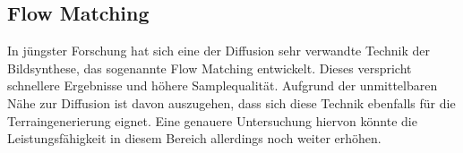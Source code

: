 \subsection{Flow Matching}

In jüngster Forschung hat sich eine der Diffusion sehr verwandte Technik der Bildsynthese, das sogenannte Flow Matching entwickelt. Dieses verspricht schnellere Ergebnisse und höhere Samplequalität. Aufgrund der unmittelbaren Nähe zur Diffusion ist davon auszugehen, dass sich diese Technik ebenfalls für die Terraingenerierung eignet. Eine genauere Untersuchung hiervon könnte die Leistungsfähigkeit in diesem Bereich allerdings noch weiter erhöhen.  


